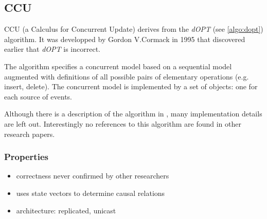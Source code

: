 \subsection{CCU}
\label{algo:ccu}

CCU (a Calculus for Concurrent Update) derives from the \emph{dOPT} (see \ref{algo:dopt}) algorithm. It was developped by Gordon V.Cormack in 1995 that discovered earlier \cite{cormack95a} that \emph{dOPT} is incorrect. 

The algorithm specifies a concurrent model based on a sequential model augmented with definitions of all possible pairs of elementary operations (e.g. insert, delete). The concurrent model is implemented by a set of objects: one for each source of events.

Although there is a description of the algorithm in \cite{cormack95b}, many implementation details are left out. Interestingly no references to this algorithm are found in other research papers.

\subsubsection{Properties}
\begin{itemize}
 \item correctness never confirmed by other researchers
 \item uses state vectors to determine causal relations
 \item architecture: replicated, unicast
\end{itemize}
